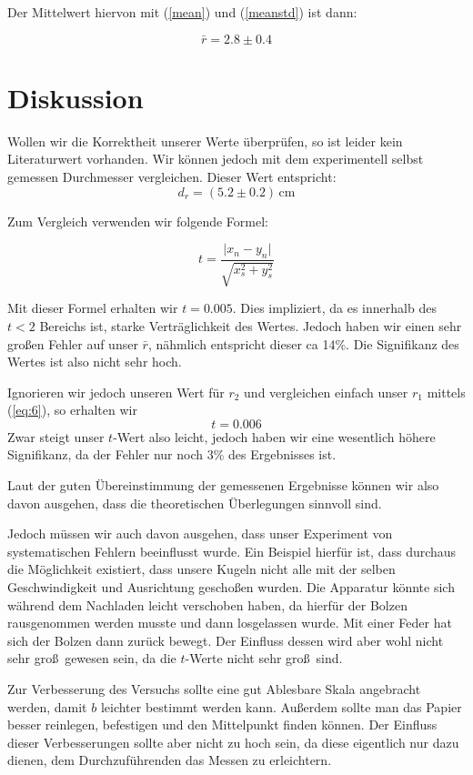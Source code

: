 \documentclass[11pt,a4paper]{article}
\begin{document}
Der Mittelwert hiervon mit (\ref{mean}) und (\ref{meanstd}) ist dann:

\[\bar{r}=2.8\pm0.4\]

\section{Diskussion}

Wollen wir die Korrektheit unserer Werte \"uberpr\"ufen, so ist leider kein Literaturwert vorhanden. Wir k\"onnen jedoch mit dem experimentell selbst gemessen Durchmesser vergleichen. Dieser Wert entspricht:
\[
d_r=(5.2\pm0.2)\,\mathrm{cm}
\]

Zum Vergleich verwenden wir folgende Formel:

\begin{equation}
t=\frac{\vert x_n-y_n\vert}{\sqrt{x_s^2+y_s^2}}\label{eq:6}
\end{equation}

Mit dieser Formel erhalten wir $t=0.005$. Dies impliziert, da es innerhalb des $t<2$ Bereichs ist, starke Vertr\"aglichkeit des Wertes. Jedoch haben wir einen sehr gro\ss en Fehler auf unser $\bar{r}$, n\"ahmlich entspricht dieser ca 14\%. Die Signifikanz des Wertes ist also nicht sehr hoch.

Ignorieren wir jedoch unseren Wert f\"ur $r_2$ und vergleichen einfach unser $r_1$ mittels (\ref{eq:6}), so erhalten wir
\[
t=0.006
\]
Zwar steigt unser $t$-Wert also leicht, jedoch haben wir eine wesentlich h\"ohere Signifikanz, da der Fehler nur noch 3\% des Ergebnisses ist.

Laut der guten \"Ubereinstimmung der gemessenen Ergebnisse k\"onnen wir also davon ausgehen, dass die theoretischen \"Uberlegungen sinnvoll sind.

Jedoch m\"ussen wir auch davon ausgehen, dass unser Experiment von systematischen Fehlern beeinflusst wurde. Ein Beispiel hierf\"ur ist, dass durchaus die M\"oglichkeit existiert, dass unsere Kugeln nicht alle mit der selben Geschwindigkeit und Ausrichtung gescho\ss en wurden. Die Apparatur k\"onnte sich w\"ahrend dem Nachladen leicht verschoben haben, da hierf\"ur der Bolzen rausgenommen werden musste und dann losgelassen wurde. Mit einer Feder hat sich der Bolzen dann zur\"uck bewegt. Der Einfluss dessen wird aber wohl nicht sehr gro\ss\ gewesen sein, da die $t$-Werte nicht sehr gro\ss\ sind.

Zur Verbesserung des Versuchs sollte eine gut Ablesbare Skala angebracht werden, damit $b$ leichter bestimmt werden kann. Au\ss erdem sollte man das Papier besser reinlegen, befestigen und den Mittelpunkt finden k\"onnen. Der Einfluss dieser Verbesserungen sollte aber nicht zu hoch sein, da diese eigentlich nur dazu dienen, dem Durchzuf\"uhrenden das Messen zu erleichtern.
\end{document}
